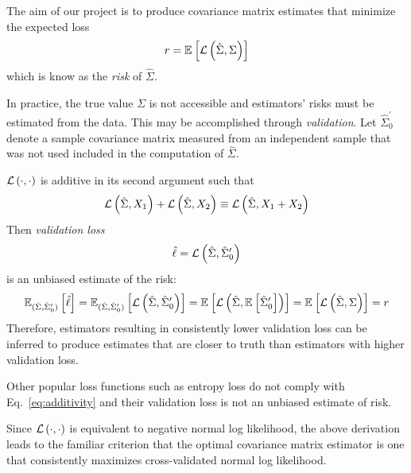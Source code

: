 The aim of our project is to produce covariance matrix estimates that minimize the expected loss 
\begin{equation}
r = \E{\loss{\hat\Sigma, \Sigma}}
\end{equation}
which is know as the \emph{risk} of $\hat\Sigma$.

In practice, the true value $\Sigma$ is not accessible and estimators' risks must be estimated from the data.  This may be accomplished through \emph{validation}. 
Let $\hat\Sigma_0^\prime$ denote a sample covariance matrix measured from an independent sample that was not used included in the computation of $\hat\Sigma$. 

$\loss{\cdot,\cdot}$ is additive in its second argument such that
 \begin{equation}\label{eq:additivity}
 \loss{\hat\Sigma,X_1} + \loss{\hat\Sigma,X_2} \equiv \loss{\hat\Sigma,X_1+X_2}
 \end{equation}
Then \emph{validation loss}  
\begin{equation}\label{eq:validationLoss}
\hat \ell = \loss{\hat\Sigma,\hat\Sigma_0^\prime}
\end{equation}
is an unbiased estimate of the risk:
 \begin{equation}\label{eq:empiricalRisk}
\E[(\hat\Sigma, \hat\Sigma_0^\prime)] {\hat\ell} 
= \E[(\hat\Sigma, \hat\Sigma_0^\prime)]{\loss{\hat\Sigma,\hat\Sigma_0^\prime}}
= \E{\loss{\hat\Sigma,\E{\hat\Sigma_0^\prime}}}
= \E{\loss{\hat\Sigma,\Sigma}} = r
 \end{equation}
Therefore, estimators resulting in consistently lower validation loss can be inferred to produce estimates that are closer to truth than estimators with higher validation loss.

Other popular loss functions such as entropy loss do not comply with Eq.~\ref{eq:additivity} and their validation loss is not an unbiased estimate of risk.

Since $\loss{\cdot,\cdot}$ is equivalent to negative normal log likelihood, the above derivation leads to the familiar criterion that the optimal covariance matrix estimator is one that consistently maximizes cross-validated normal log likelihood.